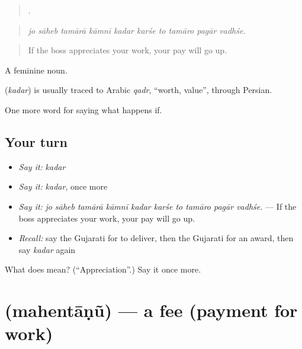 \begin{quote}
         .
\end{quote}

\begin{quote}
\emph{jo sāheb tamārā kāmnī kadar karśe to tamāro pagār vadhśe.}
\end{quote}

\begin{quote}
If the boss appreciates your work, your pay will go up.
\end{quote}

A feminine noun.

\begin{cousinweb}
\textbf{} (\emph{kadar}) is usually traced to Arabic \emph{qadr}, \textquotedblleft{}worth, value\textquotedblright{}, through Persian.
\end{cousinweb}

\begin{grammarlens}[title={What you've built}]
One more word for saying what happens if.
\end{grammarlens}

\subsection*{Your turn}
\begin{itemize}
\raggedright
  \item \emph{Say it:} \emph{kadar}
  \item \emph{Say it:} \emph{kadar}, once more
  \item \emph{Say it:} \emph{jo sāheb tamārā kāmnī kadar karśe to tamāro pagār vadhśe.} — If the boss appreciates your work, your pay will go up.
  \item \emph{Recall:} say the Gujarati for to deliver, then the Gujarati for an award, then say \emph{kadar} again
\end{itemize}

\begin{tcolorbox}[breakable,colback=teal!4,colframe=teal!35!black,title={Before you move on}]
What does  mean? (\textquotedblleft{}Appreciation\textquotedblright{}.) Say it once more.
\end{tcolorbox}
\section[\texorpdfstring{\gu{મહેનતાણું} (mahentāṇũ)}{મહેનતાણું (mahentāṇũ)}]{ (mahentāṇũ) — a fee (payment for work)}

